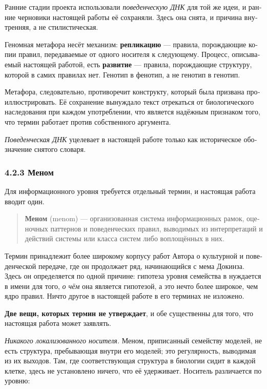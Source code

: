 \begin{russian}
Ранние стадии проекта использовали \emph{поведенческую ДНК} для той же идеи, и ранние черновики настоящей работы её сохраняли. Здесь она снята, и причина внутренняя, а не стилистическая.

Геномная метафора несёт механизм: \textbf{репликацию} — правила, порождающие копии правил, передаваемые от одного носителя к следующему. Процесс, описываемый настоящей работой, есть \textbf{развитие} — правила, порождающие структуру, которой в самих правилах нет. Генотип в фенотип, а не генотип в генотип.

Метафора, следовательно, противоречит конструкту, который была призвана проиллюстрировать. Её сохранение вынуждало текст отрекаться от биологического наследования при каждом употреблении, что является надёжным признаком того, что термин работает против собственного аргумента.

\emph{Поведенческая ДНК} уцелевает в настоящей работе только как историческое обозначение снятого словаря.


\subsubsection*{4.2.3 Меном}
\label{sec:ru:4.2.3}

Для информационного уровня требуется отдельный термин, и настоящая работа вводит один.

\begin{quote}
\textbf{Меном} (menom) — организованная система информационных рамок, оценочных паттернов и поведенческих правил, выводимых из интерпретаций и действий системы или класса систем либо воплощённых в них.
\end{quote}
Термин принадлежит более широкому корпусу работ Автора о культурной и поведенческой передаче, где он продолжает ряд, начинающийся с мема Докинза. Здесь он определяется по одной причине: гипотеза уровня семейства в  нуждается в имени для того, \emph{о чём} она является гипотезой, а это нечто более широкое, чем ядро правил. Ничто другое в настоящей работе в его терминах не изложено.

\textbf{Две вещи, которых термин не утверждает}, и обе существенны для того, что настоящая работа может заявлять.

\emph{Никакого локализованного носителя.} Меном, приписанный семейству моделей, не есть структура, пребывающая внутри его моделей; это регулярность, выводимая из их выходов. Там, где соответствующая структура в биологии сидит в каждой клетке, здесь не установлено ничего, что её удерживает. Носитель различается по уровню:


\end{russian}

